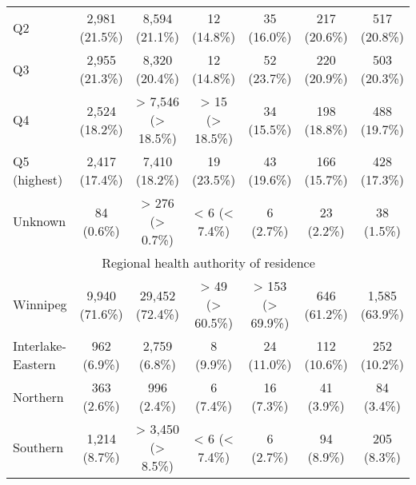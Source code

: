 \documentclass{article}
\begin{document}
\begin{table}[htbp]
\begin{longtable}{l*{6}{c}}
  Q2                                                    &          2,981 (21.5\%)         &          8,594 (21.1\%)         &           12 (14.8\%)           &           35 (16.0\%)           &           217 (20.6\%)          &           517 (20.8\%)          \\
  Q3                                                    &          2,955 (21.3\%)         &          8,320 (20.4\%)         &           12 (14.8\%)           &           52 (23.7\%)           &           220 (20.9\%)          &           503 (20.3\%)          \\
  Q4                                                    &          2,524 (18.2\%)         &        > 7,546 (> 18.5\%)       &         > 15 (> 18.5\%)         &           34 (15.5\%)           &           198 (18.8\%)          &           488 (19.7\%)          \\
  Q5 (highest)                                          &          2,417 (17.4\%)         &          7,410 (18.2\%)         &           19 (23.5\%)           &           43 (19.6\%)           &           166 (15.7\%)          &           428 (17.3\%)          \\
  Unknown                                               &            84 (0.6\%)           &         > 276 (> 0.7\%)         &          < 6 (< 7.4\%)          &            6 (2.7\%)            &            23 (2.2\%)           &            38 (1.5\%)           \\
\multicolumn{7}{c}{Regional health authority of residence                  }\\
  Winnipeg                                              &          9,940 (71.6\%)         &         29,452 (72.4\%)         &         > 49 (> 60.5\%)         &         > 153 (> 69.9\%)        &           646 (61.2\%)          &          1,585 (63.9\%)         \\
  Interlake-Eastern                                     &           962 (6.9\%)           &          2,759 (6.8\%)          &            8 (9.9\%)            &           24 (11.0\%)           &           112 (10.6\%)          &           252 (10.2\%)          \\
  Northern                                              &           363 (2.6\%)           &           996 (2.4\%)           &            6 (7.4\%)            &            16 (7.3\%)           &            41 (3.9\%)           &            84 (3.4\%)           \\
  Southern                                              &          1,214 (8.7\%)          &        > 3,450 (> 8.5\%)        &          < 6 (< 7.4\%)          &            6 (2.7\%)            &            94 (8.9\%)           &           205 (8.3\%)           \\

\end{longtable}
\end{table}
\end{document}
